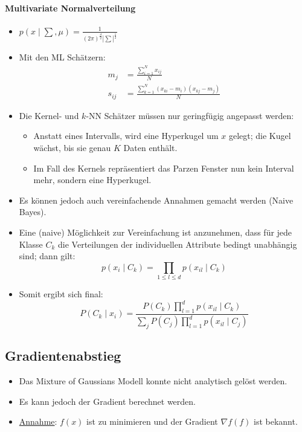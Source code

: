 \documentclass{scrartcl}
\begin{document}
\paragraph{Multivariate Normalverteilung}

\begin{itemize}
	\item $ p(x \mid \sum, \mu) = \frac{1}{(2\pi)^{\frac{d}{2}} 
	|\sum|^{\frac{1}{2}}} $
	\item Mit den ML Schätzern:
	\begin{align*}
		m_j &= \frac{\sum_{i=1}^{N} x_{ij}}{N} \\
		s_{ij} &= \frac{\sum_{k=1}^{N} (x_{ki} - m_i)(x_{kj} - m_j)}{N}
	\end{align*}
	\item Die Kernel- und $ k $-NN Schätzer müssen nur geringfügig angepasst 
	werden:
	\begin{itemize}
		\item Anstatt eines Intervalls, wird eine Hyperkugel um $ x $ gelegt; 
		die Kugel wächst, bis sie genau $ K $ Daten enthält.
		\item Im Fall des Kernels repräsentiert das Parzen Fenster nun kein 
		Interval mehr, sondern eine Hyperkugel.
	\end{itemize}
	\item Es können jedoch auch vereinfachende Annahmen gemacht werden (Naive 
	Bayes).
	\item Eine (naive) Möglichkeit zur Vereinfachung ist anzunehmen, dass für 
	jede Klasse $ C_k $ die Verteilungen der individuellen Attribute bedingt 
	unabhängig sind; dann gilt:
	\[ p(x_i \mid C_k) = \prod_{1 \leq l \leq d} p(x_{il} \mid C_k) \]
	\item Somit ergibt sich final:
	\[ P(C_k \mid x_i) = \frac{P(C_k) \prod_{l=1}^{d} p(x_{il} \mid 
	C_k)}{\sum_j P(C_j) \prod_{l=1}^{d} p(x_{il} \mid C_j)} \]
\end{itemize}

\subsection{Gradientenabstieg}

\begin{itemize}
	\item Das Mixture of Gaussians Modell konnte nicht analytisch gelöst werden.
	\item Es kann jedoch der Gradient berechnet werden.
	\item \underline{Annahme}: $ f(x) $ ist zu minimieren und der Gradient $ 
	\nabla f(f) $ ist bekannt.
\end{itemize}
\end{document}
